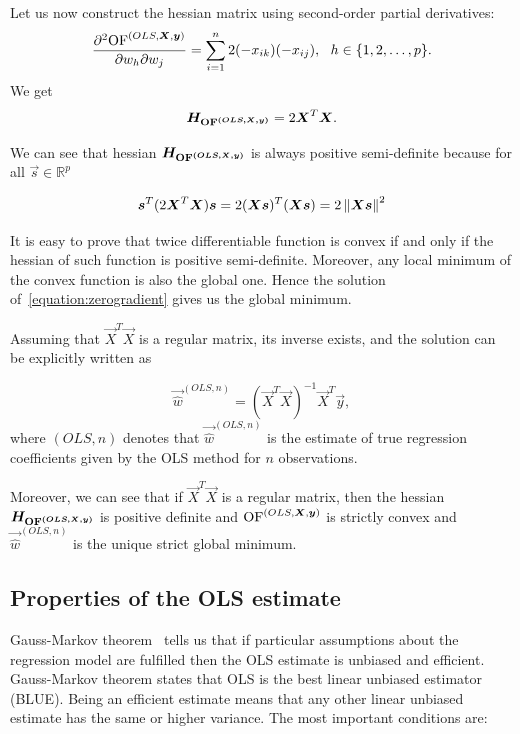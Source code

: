 Let us now construct the hessian matrix using second-order partial derivatives:
\begin{equation}
    \frac{\partial^2{\operatorname{OF}^{(OLS,\boldsymbol{X}, \boldsymbol{y})}} }{\partial w_h\partial w_j} = \sum\limits_{i=1}^n 2(- x_{ik})(-x_{ij}) \\, \ \ h \in \{{1,2,\ldots,p\}}. 
\end{equation}
We get 
\begin{equation}
    \boldsymbol{H_{\operatorname{OF}^{(OLS,\boldsymbol{X}, \boldsymbol{y})}}} = 2\boldsymbol{X}^T\boldsymbol{X}.
\end{equation}

We can see that hessian $\boldsymbol{H_{\operatorname{OF}^{(OLS,\boldsymbol{X}, \boldsymbol{y})}}}$ is always positive semi-definite because for all $\vec{s} \in \mathbb{R}^p$

\begin{equation}
    \boldsymbol{s}^T(2\boldsymbol{X}^T\boldsymbol{X})\boldsymbol{s} = 2(\boldsymbol{X}\boldsymbol{s})^T(\boldsymbol{X}\boldsymbol{s}) =  2 \left\lVert\boldsymbol{X}\boldsymbol{s}\right\rVert^2
\end{equation}

It is easy to prove that twice differentiable function is convex if and only if the hessian of such function is positive semi-definite. Moreover, any local minimum of the convex function is also the global one. Hence the solution of~\eqref{equation:zerogradient} gives us the global minimum. 

Assuming that $\vec{X}^T\vec{X}$ is a regular matrix, its inverse exists, and the solution can be explicitly written as

\begin{equation} \label{wols}
    \vec{\hat{w}}^{(OLS,n)} = (\vec{X}^T\vec{X})^{-1}\vec{X}^T\vec{y}, 
\end{equation}
where $(OLS,n)$ denotes that $\vec{\hat{w}}^{(OLS,n)}$ is the estimate of true regression coefficients given by the OLS method for $n$ observations. 

Moreover, we can see that if $\vec{X}^T\vec{X}$ is a regular matrix, then the hessian $\boldsymbol{H_{\operatorname{OF}^{(OLS,\boldsymbol{X}, \boldsymbol{y})}}}$ is positive definite and $\operatorname{OF}^{(OLS,\boldsymbol{X}, \boldsymbol{y})}$ is strictly convex and $\vec{\hat{w}}^{(OLS,n)}$ is the unique strict global minimum.


\subsection{Properties of the OLS estimate}
Gauss-Markov theorem~\cite{mccullagh2018generalized} tells us that if particular assumptions about the regression model are fulfilled then the OLS estimate is unbiased and efficient. Gauss-Markov theorem states that OLS is the best linear unbiased estimator (BLUE). Being an efficient estimate means that any other linear unbiased estimate has the same or higher variance. The most important conditions are:

